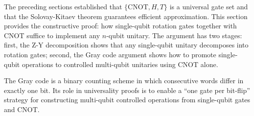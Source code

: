 \documentclass[12pt, a4paper, oneside]{report}
\theoremstyle{plain}
\theoremstyle{definition}
\theoremstyle{remark}
\newcommand{\CNOT}{\mathrm{CNOT}}
\begin{document}
The preceding sections established that $\{\CNOT, H, T\}$ is a universal gate set and that
the Solovay-Kitaev theorem guarantees efficient approximation. This section provides the
constructive proof: how single-qubit rotation gates together with $\CNOT$ suffice to implement
any $n$-qubit unitary. The argument has two stages: first, the Z-Y decomposition shows that
any single-qubit unitary decomposes into rotation gates; second, the Gray code argument shows
how to promote single-qubit operations to controlled multi-qubit unitaries using $\CNOT$ alone.

The Gray code is a binary counting scheme in which consecutive words differ in exactly one
bit. Its role in universality proofs is to enable a ``one gate per bit-flip'' strategy for
constructing multi-qubit controlled operations from single-qubit gates and $\CNOT$.
\end{document}
